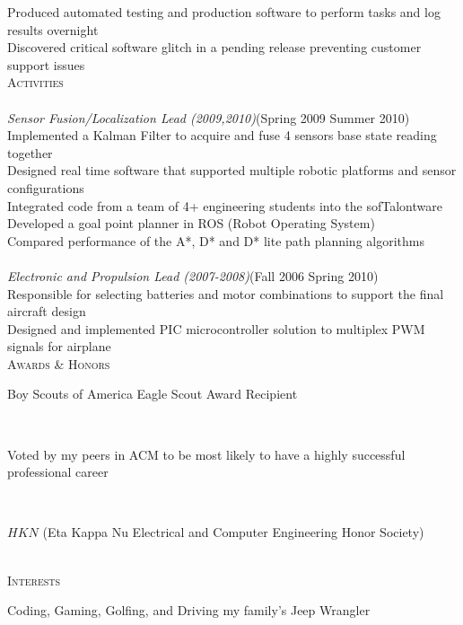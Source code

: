 \documentclass[11pt,letterpaper]{article}
\newcommand{\SectionHeader}[1]{\textsc{#1} \vspace{-2px}\\}
\newcommand{\CompanyHeader}[4]{\hspace*{.52in}{\bf#1} \hfill #2 \\\hspace*{.5in}\emph{#3}\hfill (#4) \\}
\newcommand{\ResumeItem}[1]{\hspace*{.5in}\textopenbullet\hspace*{.2in}#1\\}
\newcommand{\TextBlock}[1]
{\hspace*{.5in} \begin{minipage}[t]{\textwidth -.5in} #1 \end{minipage}\\}
\begin{document}
 \ResumeItem{Produced automated testing and production software to perform tasks and log results overnight} 
 \ResumeItem{Discovered critical software glitch in a pending release preventing customer support issues}
\SectionHeader{Activities}
\CompanyHeader{Intelligent Ground Vehicle Competition (IGVC)}{}{Sensor Fusion/Localization Lead (2009,2010)}{Spring 2009 \textendash { }Summer 2010}
 \ResumeItem{Implemented a Kalman Filter to acquire and fuse 4 sensors base state reading together}
 \ResumeItem{Designed real time software that supported multiple robotic platforms and sensor configurations}
 \ResumeItem{Integrated code from a team of 4+ engineering students into the sofTalontware}
 \ResumeItem{Developed a goal point planner in ROS (Robot Operating System)}
 \ResumeItem{Compared performance of the A*, D* and D* lite path planning algorithms}
 \CompanyHeader{Design Build Fly/DBF}{}{Electronic and Propulsion Lead (2007-2008)}{Fall 2006 \textendash { }Spring 2010}
 \ResumeItem{Responsible for selecting batteries and motor combinations to support the final aircraft design}
\ResumeItem{Designed and implemented PIC microcontroller solution to multiplex PWM signals for airplane}
\SectionHeader{Awards \& Honors}
\TextBlock{Boy Scouts of America Eagle Scout Award Recipient}
\TextBlock{Voted by my peers in ACM to be most likely to have a highly successful professional career}
\TextBlock{$HKN$ (Eta Kappa Nu Electrical and Computer Engineering Honor Society)}
\SectionHeader{Interests}
\TextBlock{Coding, Gaming, Golfing, and Driving my family's Jeep Wrangler}
\end{document}
